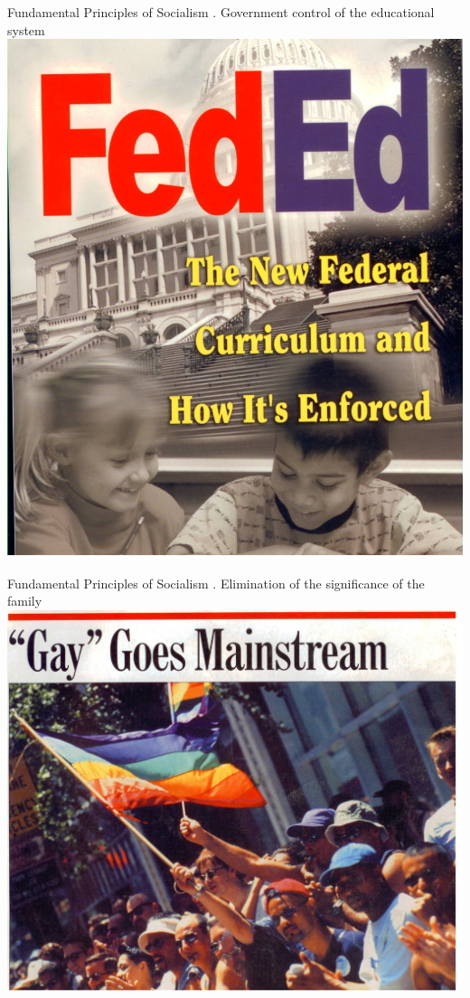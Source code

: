 \begin{frame}{Fundamental Principles of Socialism}
    . Government control of the educational system \\
    \includegraphics[height=.9\textheight]{img/education.jpg} \\
\end{frame}

\begin{frame}{Fundamental Principles of Socialism}
    . Elimination of the significance of the family \\
    \includegraphics[height=.9\textheight]{img/gay.jpg} \\
\end{frame}

